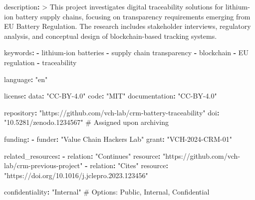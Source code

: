 \documentclass[
  oneside,
  open=any]{scrbook}
\newenvironment{Shaded}{\begin{snugshade}}{\end{snugshade}}
\newcommand{\AttributeTok}[1]{\textcolor[rgb]{0.40,0.45,0.13}{#1}}
\newcommand{\CharTok}[1]{\textcolor[rgb]{0.13,0.47,0.30}{#1}}
\newcommand{\CommentTok}[1]{\textcolor[rgb]{0.37,0.37,0.37}{#1}}
\newcommand{\FunctionTok}[1]{\textcolor[rgb]{0.28,0.35,0.67}{#1}}
\newcommand{\KeywordTok}[1]{\textcolor[rgb]{0.00,0.23,0.31}{\textbf{#1}}}
\newcommand{\NormalTok}[1]{\textcolor[rgb]{0.00,0.23,0.31}{#1}}
\newcommand{\StringTok}[1]{\textcolor[rgb]{0.13,0.47,0.30}{#1}}
\begin{document}
\begin{Shaded}
\begin{Highlighting}[]
\FunctionTok{description}\KeywordTok{: }\CharTok{\textgreater{}}
\NormalTok{  This project investigates digital traceability solutions for lithium{-}ion}
\NormalTok{  battery supply chains, focusing on transparency requirements emerging from}
\NormalTok{  EU Battery Regulation. The research includes stakeholder interviews,}
\NormalTok{  regulatory analysis, and conceptual design of blockchain{-}based tracking}
\NormalTok{  systems.}

\FunctionTok{keywords}\KeywordTok{:}
\AttributeTok{  }\KeywordTok{{-}}\AttributeTok{ lithium{-}ion batteries}
\AttributeTok{  }\KeywordTok{{-}}\AttributeTok{ supply chain transparency}
\AttributeTok{  }\KeywordTok{{-}}\AttributeTok{ blockchain}
\AttributeTok{  }\KeywordTok{{-}}\AttributeTok{ EU regulation}
\AttributeTok{  }\KeywordTok{{-}}\AttributeTok{ traceability}

\FunctionTok{language}\KeywordTok{:}\AttributeTok{ }\StringTok{"en"}

\FunctionTok{license}\KeywordTok{:}
\AttributeTok{  }\FunctionTok{data}\KeywordTok{:}\AttributeTok{ }\StringTok{"CC{-}BY{-}4.0"}
\AttributeTok{  }\FunctionTok{code}\KeywordTok{:}\AttributeTok{ }\StringTok{"MIT"}
\AttributeTok{  }\FunctionTok{documentation}\KeywordTok{:}\AttributeTok{ }\StringTok{"CC{-}BY{-}4.0"}

\FunctionTok{repository}\KeywordTok{:}\AttributeTok{ }\StringTok{"https://github.com/vch{-}lab/crm{-}battery{-}traceability"}
\FunctionTok{doi}\KeywordTok{:}\AttributeTok{ }\StringTok{"10.5281/zenodo.1234567"}\CommentTok{  \# Assigned upon archiving}

\FunctionTok{funding}\KeywordTok{:}
\AttributeTok{  }\KeywordTok{{-}}\AttributeTok{ }\FunctionTok{funder}\KeywordTok{:}\AttributeTok{ }\StringTok{"Value Chain Hackers Lab"}
\AttributeTok{    }\FunctionTok{grant}\KeywordTok{:}\AttributeTok{ }\StringTok{"VCH{-}2024{-}CRM{-}01"}

\FunctionTok{related\_resources}\KeywordTok{:}
\AttributeTok{  }\KeywordTok{{-}}\AttributeTok{ }\FunctionTok{relation}\KeywordTok{:}\AttributeTok{ }\StringTok{"Continues"}
\AttributeTok{    }\FunctionTok{resource}\KeywordTok{:}\AttributeTok{ }\StringTok{"https://github.com/vch{-}lab/crm{-}previous{-}project"}
\AttributeTok{  }\KeywordTok{{-}}\AttributeTok{ }\FunctionTok{relation}\KeywordTok{:}\AttributeTok{ }\StringTok{"Cites"}
\AttributeTok{    }\FunctionTok{resource}\KeywordTok{:}\AttributeTok{ }\StringTok{"https://doi.org/10.1016/j.jclepro.2023.123456"}

\FunctionTok{confidentiality}\KeywordTok{:}\AttributeTok{ }\StringTok{"Internal"}\CommentTok{  \# Options: Public, Internal, Confidential}
\end{Highlighting}
\end{Shaded}
\end{document}
